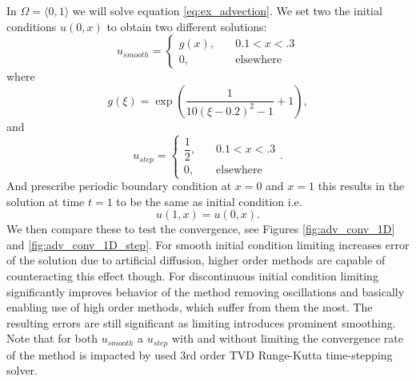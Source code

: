 \begin{example}[Advection 1D]
\label{ex:adv1D}
In $\Omega = \langle 0, 1 \rangle$ we will solve equation \eqref{eq:ex_advection}.
We set two the initial conditions $u(0, x)$ to obtain two different solutions:
\begin{equation}
u_{smooth} = \begin{cases}
g(x),\quad &0.1 < x < .3\\
0, \quad &\text{elsewhere}
\end{cases}
\end{equation}
where
\begin{equation}
g(\xi) = \exp\left(\frac{1}{10(\xi - 0.2)^2 - 1}+ 1\right),
\end{equation}
and
\begin{equation}
u_{step} = \begin{cases}
\dfrac{1}{2},\quad &0.1 < x < .3\\
0, \quad &\text{elsewhere}
\end{cases}.
\end{equation}
And prescribe periodic boundary condition at $x = 0 $ and $x = 1$  this 
results in the solution at time $t = 1$ to be the same as initial condition 
i.e.
\begin{equation}
u(1, x) = u(0, x).
\end{equation} 
We then compare these to test the convergence, see Figures 
\ref{fig:adv_conv_1D} and \ref{fig:adv_conv_1D_step}. For smooth initial condition 
limiting increases error of the solution due to artificial diffusion, higher order 
methods are capable of counteracting this effect though. For discontinuous initial 
condition limiting significantly improves behavior of the method removing oscillations 
and basically enabling use of high order methods, which suffer from them the most. The 
resulting errors are still significant as limiting introduces prominent 
smoothing. Note that for both $u_{smooth}$ a $u_{step}$ with and without limiting the 
convergence rate of the method is impacted by used 3rd order TVD Runge-Kutta 
time-stepping solver. 
\end{example}

